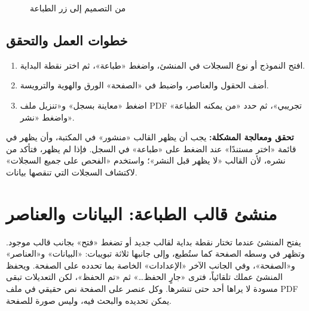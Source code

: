 \begin{figure}[H]
\centering
{}
\rclegend
\caption{من التصميم إلى زر الطباعة}
\label{fig:builder-print-flow}
\end{figure}

\subsection{خطوات العمل والتحقق}
\begin{enumerate}
\item افتح النموذج أو نوع السجلات في المنشئ، واضغط «طباعة»، ثم اختر نقطة البداية.
\item أضف الحقول والعناصر، واضبط في «الصفحة» الورق والهوية والترويسة.
\item اضغط «معاينة بسجل» و«تنزيل ملف PDF تجريبي»، ثم حدد «من يمكنه الطباعة» واضغط «نشر».
\end{enumerate}

\textbf{تحقق ومعالجة المشكلة:} يجب أن يظهر القالب «منشور» في المكتبة، وأن يظهر في قائمة «اختر مستندًا» عند الضغط على «طباعة» في السجل. فإذا لم يظهر، فتأكد من نشره، لأن القالب «لا يظهر قبل النشر»؛ واستخدم «الفحص على جميع السجلات» لاكتشاف السجلات التي تنقصها بيانات.

\clearpage
\section{منشئ قالب الطباعة: البيانات والعناصر}
\label{sec:builder-feature-print-builder}

يفتح المنشئ عندما تختار نقطة بداية لقالب جديد أو تضغط «فتح» بجانب قالب موجود. وتظهر في وسطه الصفحة كما ستُطبع، وإلى جانبها ثلاثة تبويبات: «البيانات» و«العناصر» و«الصفحة»، وفي الجانب الآخر «الإعدادات» الخاصة بما تحدده على الصفحة. ويحفظ المنشئ عملك تلقائياً، فترى «جارٍ الحفظ…» ثم «تم الحفظ»، لكن التعديلات تبقى مسودة لا يراها أحد حتى تنشرها. وكل عنصر على الصفحة نص حقيقي في ملف PDF يمكن تحديده والبحث فيه، وليس صورة للصفحة.

